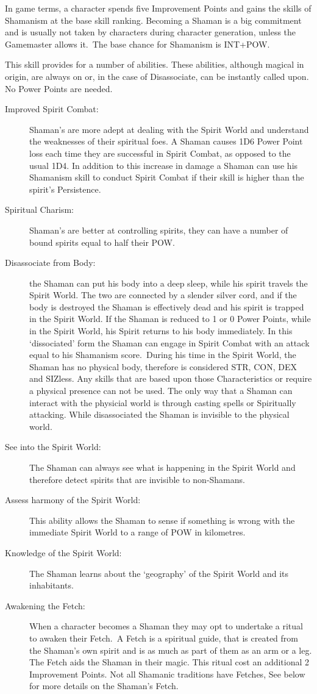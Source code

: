 In game terms, a character spends five Improvement Points and gains the skills of Shamanism at the base skill ranking. Becoming a Shaman is a big commitment and is usually not taken by characters during character generation, unless the Gamemaster allows it. The base chance for Shamanism is INT+POW.

This skill provides for a number of abilities. These abilities, although magical in origin, are always on or, in the case of Disassociate, can be instantly called upon. No Power Points are needed.

\begin{description}
\item[Improved Spirit Combat:] Shaman’s are more adept at dealing with the Spirit World and understand the weaknesses of their spiritual foes. A Shaman causes 1D6 Power Point loss each time they are successful in Spirit Combat, as opposed to the usual 1D4. In addition to this increase in damage a Shaman can use his Shamanism skill to conduct Spirit Combat if their skill is higher than the spirit’s Persistence.
\item[Spiritual Charism:] Shaman’s are better at controlling spirits, they can have a number of bound spirits equal to half their POW.
\item[Disassociate from Body:] the Shaman can put his body into a deep sleep, while his spirit travels the Spirit World. The two are connected by a slender silver cord, and if the body is destroyed the Shaman is effectively dead and his spirit is trapped in the Spirit World. If the Shaman is reduced to 1 or 0 Power Points, while in the Spirit World, his Spirit returns to his body immediately. In this ‘dissociated’ form the Shaman can engage in Spirit Combat with an attack equal to his Shamanism score. During his time in the Spirit World, the Shaman has no physical body, therefore is considered STR, CON, DEX and SIZless. Any skills that are based upon those Characteristics or require a physical presence can not be used. The only way that a Shaman can interact with the physicial world is through casting spells or Spiritually attacking. While disassociated the Shaman is invisible to the physical world.
\item[See into the Spirit World:] The Shaman can always see what is happening in the Spirit World and therefore detect spirits that are invisible to non-Shamans.
\item[Assess harmony of the Spirit World:] This ability allows the Shaman to sense if something is wrong with the immediate Spirit World to a range of POW in kilometres. 
\item[Knowledge of the Spirit World:] The Shaman learns about the ‘geography’ of the Spirit World and its inhabitants.
\item[Awakening the Fetch:] When a character becomes a Shaman they may opt to undertake a ritual to awaken their Fetch. A Fetch is a spiritual guide, that is created from the Shaman’s own spirit and is as much as part of them as an arm or a leg. The Fetch aids the Shaman in their magic. This ritual cost an additional 2 Improvement Points. Not all Shamanic traditions have Fetches, See below for more details on the Shaman’s Fetch.  
\end{description}


